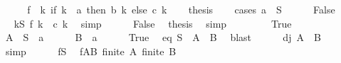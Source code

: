 \begin{isabellebody}
%
\isadelimproof
%
\endisadelimproof
%
\isatagproof
{}\isamarkupfalse%
\ {\isacharminus}{\kern0pt}\isanewline
\ \ \isamarkupfalse%
\ {\isacharquery}{\kern0pt}f\ {\isacharequal}{\kern0pt}\ {\isachardoublequoteopen}{\isacharparenleft}{\kern0pt}{\isasymlambda}k{\isachardot}{\kern0pt}\ if\ k\ {\isacharequal}{\kern0pt}\ a\ then\ b\ k\ else\ c\ k{\isacharparenright}{\kern0pt}{\isachardoublequoteclose}\isanewline
\ \ \isamarkupfalse%
\ {\isacharquery}{\kern0pt}thesis\isanewline
\ \ \isamarkupfalse%
\ {\isacharparenleft}{\kern0pt}cases\ {\isachardoublequoteopen}a\ {\isasymin}\ S{\isachardoublequoteclose}{\isacharparenright}{\kern0pt}\isanewline
\ \ \ \ \isamarkupfalse%
\ False\isanewline
\ \ \ \ \isamarkupfalse%
\ \isamarkupfalse%
\ {\isachardoublequoteopen}{\isasymforall}k{\isasymin}S{\isachardot}{\kern0pt}\ {\isacharquery}{\kern0pt}f\ k\ {\isacharequal}{\kern0pt}\ c\ k{\isachardoublequoteclose}\ \isamarkupfalse%
\ simp\isanewline
\ \ \ \ \isamarkupfalse%
\ False\ \isamarkupfalse%
\ {\isacharquery}{\kern0pt}thesis\ \isamarkupfalse%
\ simp\isanewline
\ \ \isamarkupfalse%
\isanewline
\ \ \ \ \isamarkupfalse%
\ True\isanewline
\ \ \ \ \isamarkupfalse%
\ {\isacharquery}{\kern0pt}A\ {\isacharequal}{\kern0pt}\ {\isachardoublequoteopen}S\ {\isacharminus}{\kern0pt}\ {\isacharbraceleft}{\kern0pt}a{\isacharbraceright}{\kern0pt}{\isachardoublequoteclose}\isanewline
\ \ \ \ \isamarkupfalse%
\ {\isacharquery}{\kern0pt}B\ {\isacharequal}{\kern0pt}\ {\isachardoublequoteopen}{\isacharbraceleft}{\kern0pt}a{\isacharbraceright}{\kern0pt}{\isachardoublequoteclose}\isanewline
\ \ \ \ \isamarkupfalse%
\ True\ \isamarkupfalse%
\ eq{\isacharcolon}{\kern0pt}\ {\isachardoublequoteopen}S\ {\isacharequal}{\kern0pt}\ {\isacharquery}{\kern0pt}A\ {\isasymunion}\ {\isacharquery}{\kern0pt}B{\isachardoublequoteclose}\ \isamarkupfalse%
\ blast\isanewline
\ \ \ \ \isamarkupfalse%
\ dj{\isacharcolon}{\kern0pt}\ {\isachardoublequoteopen}{\isacharquery}{\kern0pt}A\ {\isasyminter}\ {\isacharquery}{\kern0pt}B\ {\isacharequal}{\kern0pt}\ {\isacharbraceleft}{\kern0pt}{\isacharbraceright}{\kern0pt}{\isachardoublequoteclose}\ \isamarkupfalse%
\ simp\isanewline
\ \ \ \ \isamarkupfalse%
\ fS\ \isamarkupfalse%
\ fAB{\isacharcolon}{\kern0pt}\ {\isachardoublequoteopen}finite\ {\isacharquery}{\kern0pt}A{\isachardoublequoteclose}\ {\isachardoublequoteopen}finite\ {\isacharquery}{\kern0pt}B{\isachardoublequoteclose}\ \isamarkupfalse%

\end{isabellebody}
